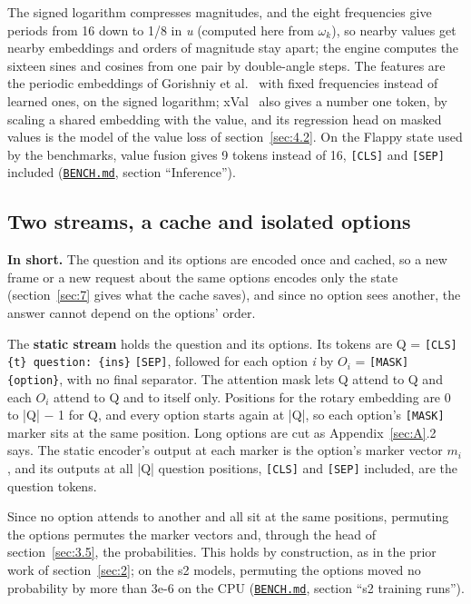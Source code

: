 \documentclass[10pt]{article}
\begin{document}
The signed logarithm compresses magnitudes, and the eight frequencies give periods from 16 down to 1/8 in \emph{u} (computed here from $\omega_{k}$), so nearby values get nearby embeddings and orders of magnitude stay apart; the engine computes the sixteen sines and cosines from one pair by double-angle steps. The features are the periodic embeddings of Gorishniy et al.~\cite{gorishniy2022num} with fixed frequencies instead of learned ones, on the signed logarithm; xVal~\cite{golkar2023xval} also gives a number one token, by scaling a shared embedding with the value, and its regression head on masked values is the model of the value loss of section~\ref{sec:4.2}. On the Flappy state used by the benchmarks, value fusion gives 9 tokens instead of 16, \texttt{[CLS]} and \texttt{[SEP]} included (\href{https://github.com/maxgfr/skycmd/blob/main/BENCH.md}{\texttt{BENCH.md}}, section ``Inference'').

\subsection{Two streams, a cache and isolated options}\label{sec:3.3}

\textbf{In short.} The question and its options are encoded once and cached, so a new frame or a new request about the same options encodes only the state (section~\ref{sec:7} gives what the cache saves), and since no option sees another, the answer cannot depend on the options' order.

The \textbf{static stream} holds the question and its options. Its tokens are Q = \texttt{[CLS]} \texttt{\{t\} question: \{ins\}} \texttt{[SEP]}, followed for each option \emph{i} by $O_{i}$ = \texttt{[MASK]} \texttt{ \{option\}}, with no final separator. The attention mask lets Q attend to Q and each $O_{i}$ attend to Q and to itself only. Positions for the rotary embedding are 0 to |Q| $-$ 1 for Q, and every option starts again at |Q|, so each option's \texttt{[MASK]} marker sits at the same position. Long options are cut as Appendix~\ref{sec:A}.2 says. The static encoder's output at each marker is the option's marker vector $m_{i}$, and its outputs at all |Q| question positions, \texttt{[CLS]} and \texttt{[SEP]} included, are the question tokens.

Since no option attends to another and all sit at the same positions, permuting the options permutes the marker vectors and, through the head of section~\ref{sec:3.5}, the probabilities. This holds by construction, as in the prior work of section~\ref{sec:2}; on the s2 models, permuting the options moved no probability by more than 3e-6 on the CPU (\href{https://github.com/maxgfr/skycmd/blob/main/BENCH.md}{\texttt{BENCH.md}}, section ``s2 training runs'').
\end{document}
